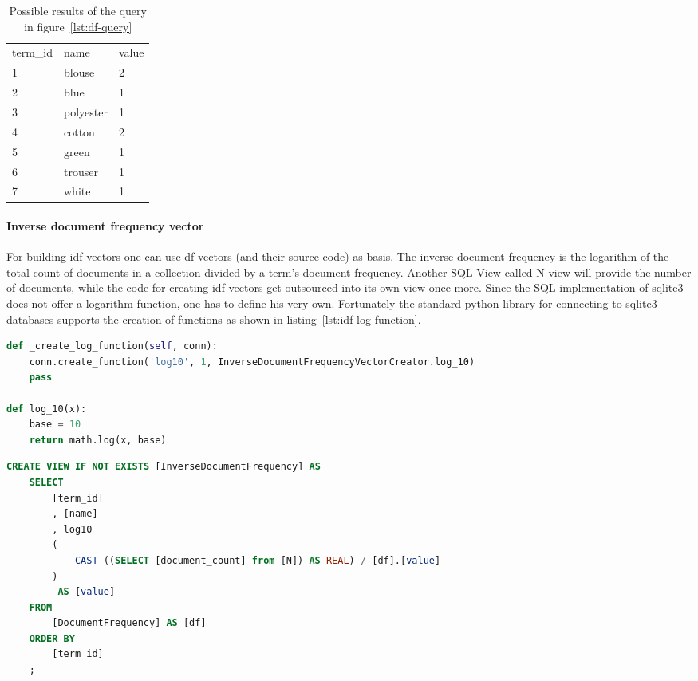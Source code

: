 \begin{table}
    \center
    \begin{tabular}{ l | l | l }
        \rowcolor{\dustRowHead}
        \multicolumn{3}{ c }{\textbf{df}}\\\hline
        term\_id    & name      & value\\\hline
        1           & blouse    & 2\\
        2           & blue      & 1\\
        3           & polyester & 1\\
        4           & cotton    & 2\\
        5           & green     & 1\\
        6           & trouser   & 1\\
        7           & white     & 1\\
    \end{tabular}
    \caption{Possible results of the query in figure~\ref{lst:df-query}}
    \label{tab:df-query-result}
\end{table}

\FloatBarrier

\paragraph{Inverse document frequency vector}
For building idf-vectors one can use df-vectors (and their source code) as basis.
The inverse document frequency is the logarithm of the total count of documents in a collection divided by a term's document frequency.
Another SQL-View called N-view will provide the number of documents, while the code for creating idf-vectors get outsourced into its own view once more.
Since the SQL implementation of \gls{sqlite3} does not offer a logarithm-function, one has to define his very own.
Fortunately the standard python library for connecting to sqlite3-databases supports the creation of functions as shown in listing~\ref{lst:idf-log-function}.


\begin{lstlisting}[language=Python,caption={Preparing the log-function for SQL-statement in listing~\ref{lst:idf-view}},label={lst:idf-log-function},float=h]
def _create_log_function(self, conn):
    conn.create_function('log10', 1, InverseDocumentFrequencyVectorCreator.log_10)
    pass

def log_10(x):
    base = 10
    return math.log(x, base)
\end{lstlisting}
\begin{lstlisting}[language=SQL,caption={SQL-statement to create the InverseDocumentFrequency-view},label={lst:idf-view},float=h]
CREATE VIEW IF NOT EXISTS [InverseDocumentFrequency] AS
    SELECT
        [term_id]
        , [name]
        , log10
        (
            CAST ((SELECT [document_count] from [N]) AS REAL) / [df].[value]
        )
         AS [value]
    FROM
        [DocumentFrequency] AS [df]
    ORDER BY
        [term_id]
    ;
\end{lstlisting}


